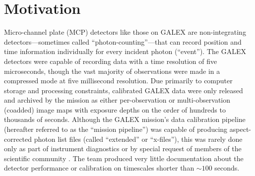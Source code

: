\documentclass[preprint]{aastex}
\begin{document}
\section{Motivation}
\label{motivation}
Micro-channel plate (MCP) detectors like those on GALEX are non-integrating detectors---sometimes called ``photon-counting''---that can record position and time information individually for every incident photon (``event''). The GALEX detectors were capable of recording data with a time resolution of five microseconds, though the vast majority of observations were made in a compressed mode at five millisecond resolution. Due primarily to computer storage and processing constraints, calibrated GALEX data were only released and archived by the mission as either per-observation or multi-observation (coadded) image maps with exposure depths on the order of hundreds to thousands of seconds. Although the GALEX mission's data calibration pipeline (hereafter referred to as the ``mission pipeline'') was capable of producing aspect-corrected photon list files (called ``extended'' or ``x-files''), this was rarely done only as part of instrument diagnostics or by special request of members of the scientific community \citep{rob2005, wel2007}. The team produced very little documentation about the detector performance or calibration on timescales shorter than $\sim 100$ seconds.
\end{document}
